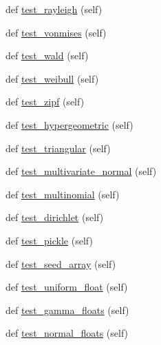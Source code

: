 \begin{DoxyCompactItemize}
\item 
def \hyperlink{classnumpy_1_1random_1_1tests_1_1test__smoke_1_1RNG_ad573f434913f91f5dde3b4b5c8d29896}{test\+\_\+rayleigh} (self)
\item 
def \hyperlink{classnumpy_1_1random_1_1tests_1_1test__smoke_1_1RNG_ad70b1a9e9e48f143fc8b102be9f33874}{test\+\_\+vonmises} (self)
\item 
def \hyperlink{classnumpy_1_1random_1_1tests_1_1test__smoke_1_1RNG_a9e79aa73bc54b2d66151ead80ff5984a}{test\+\_\+wald} (self)
\item 
def \hyperlink{classnumpy_1_1random_1_1tests_1_1test__smoke_1_1RNG_ad929e52977c5dc533323553dbc52348e}{test\+\_\+weibull} (self)
\item 
def \hyperlink{classnumpy_1_1random_1_1tests_1_1test__smoke_1_1RNG_a853bfebc5f8352a92bcf0bea27f7a4b2}{test\+\_\+zipf} (self)
\item 
def \hyperlink{classnumpy_1_1random_1_1tests_1_1test__smoke_1_1RNG_a3b9928d8528f02070d68cfeed9cfabec}{test\+\_\+hypergeometric} (self)
\item 
def \hyperlink{classnumpy_1_1random_1_1tests_1_1test__smoke_1_1RNG_a83056d2e803b9548e0292240aa21ce0b}{test\+\_\+triangular} (self)
\item 
def \hyperlink{classnumpy_1_1random_1_1tests_1_1test__smoke_1_1RNG_abfc2d574db3643f82108ceadab834fb5}{test\+\_\+multivariate\+\_\+normal} (self)
\item 
def \hyperlink{classnumpy_1_1random_1_1tests_1_1test__smoke_1_1RNG_a54523a99fcf0903062a47d7f4d90357e}{test\+\_\+multinomial} (self)
\item 
def \hyperlink{classnumpy_1_1random_1_1tests_1_1test__smoke_1_1RNG_a47f63578d7d951cc93cd1b06dce93ac4}{test\+\_\+dirichlet} (self)
\item 
def \hyperlink{classnumpy_1_1random_1_1tests_1_1test__smoke_1_1RNG_a98ed843482968f8e962973d27a84e5a8}{test\+\_\+pickle} (self)
\item 
def \hyperlink{classnumpy_1_1random_1_1tests_1_1test__smoke_1_1RNG_add3dad36b19e835e0349d020704e1338}{test\+\_\+seed\+\_\+array} (self)
\item 
def \hyperlink{classnumpy_1_1random_1_1tests_1_1test__smoke_1_1RNG_a2bcd901ceb896b6497df24660aabd343}{test\+\_\+uniform\+\_\+float} (self)
\item 
def \hyperlink{classnumpy_1_1random_1_1tests_1_1test__smoke_1_1RNG_a9b33fcecae19135ef872b0cec41496a4}{test\+\_\+gamma\+\_\+floats} (self)
\item 
def \hyperlink{classnumpy_1_1random_1_1tests_1_1test__smoke_1_1RNG_a4f7aa0deed4c326eb196a661d3d5b710}{test\+\_\+normal\+\_\+floats} (self)

\end{DoxyCompactItemize}
